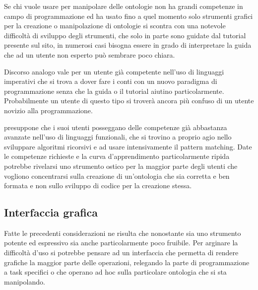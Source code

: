 Se chi vuole usare \cduce per manipolare delle ontologie non ha grandi competenze in campo di programmazione ed ha usato fino a quel momento solo strumenti grafici per la creazione o manipolazione di ontologie si scontra con una notevole difficoltà di sviluppo degli strumenti, che solo in parte sono guidate dal tutorial presente sul sito, in numerosi casi bisogna essere in grado di interpretare la guida che ad un utente non esperto può sembrare poco chiara.

Discorso analogo vale per un utente già competente nell'uso di linguaggi imperativi che si trova a dover fare i conti con un nuovo paradigma di programmazione senza che la guida o il tutorial aiutino particolarmente. Probabilmente un utente di questo tipo si troverà ancora più confuso di un utente novizio alla programmazione.

\cduce presuppone che i suoi utenti posseggano delle competenze già abbastanza avanzate nell'uso di linguaggi funzionali, che si trovino a proprio agio nello sviluppare algoritmi ricorsivi e ad usare intensivamente il pattern matching. Date le competenze richieste e la curva d'apprendimento particolarmente ripida \cduce potrebbe rivelarsi uno strumento ostico per la maggior parte degli utenti che vogliono concentrarsi sulla creazione di un'ontologia che sia corretta e ben formata e non sullo sviluppo di codice per la creazione stessa.

\subsection{Interfaccia grafica}\label{ch5.4}
Fatte le precedenti considerazioni ne risulta che nonostante \cduce sia uno strumento potente ed espressivo sia anche particolarmente poco fruibile. Per arginare la difficoltà d'uso si potrebbe pensare ad un interfaccia che permetta di rendere grafiche la maggior parte delle operazioni, relegando la parte di programmazione a task specifici o che operano ad hoc sulla particolare ontologia che si sta manipolando.

